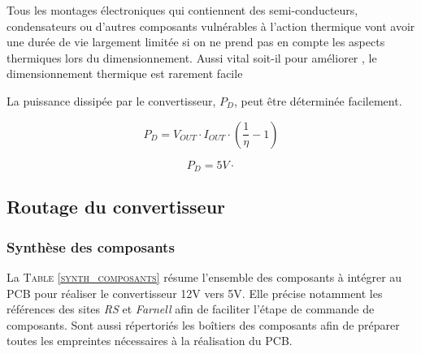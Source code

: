 			Tous les montages électroniques qui contiennent des semi-conducteurs, condensateurs ou d'autres composants vulnérables à l'action thermique vont avoir une durée de vie largement limitée si on ne prend pas en compte les aspects thermiques lors du dimensionnement. Aussi vital soit-il pour améliorer , le dimensionnement thermique est rarement facile 	
			
			La puissance dissipée par le convertisseur, $P_D$, peut être déterminée facilement.
			
			\begin{equation}
				P_D = V_{OUT}\cdot I_{OUT}\cdot\left(\frac{1}{\eta}-1\right)
			\end{equation}	
			
			\begin{equation}
				P_D  = 5V\cdot
			\end{equation}							
			
			
			
			\subsection{Routage du convertisseur}
			
				\subsubsection{Synthèse des composants}
				
				La \textsc{Table \ref{synth_composants}} résume l'ensemble des composants à intégrer au PCB pour réaliser le convertisseur 12V vers 5V. Elle précise notamment les références des sites \textit{RS} et \textit{Farnell} afin de faciliter l'étape de commande de composants. Sont aussi répertoriés les boîtiers des composants afin de préparer toutes les empreintes nécessaires à la réalisation du PCB.
				
